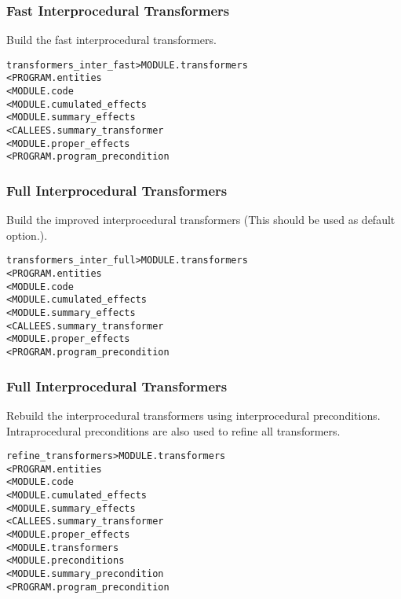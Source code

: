\documentclass[a4paper]{report}
\newenvironment{PipsMake}{\begin{alltt}}{\end{alltt}}
\begin{document}
\subsubsection{Fast Interprocedural Transformers}

Build the fast interprocedural transformers.

\begin{PipsMake}
transformers_inter_fast         > MODULE.transformers
        < PROGRAM.entities
        < MODULE.code
        < MODULE.cumulated_effects
        < MODULE.summary_effects
        < CALLEES.summary_transformer
        < MODULE.proper_effects
        < PROGRAM.program_precondition
\end{PipsMake}

\subsubsection{Full Interprocedural Transformers}

Build the improved interprocedural transformers (This should be used
as default option.).

\begin{PipsMake}
transformers_inter_full         > MODULE.transformers
        < PROGRAM.entities
        < MODULE.code
        < MODULE.cumulated_effects
        < MODULE.summary_effects
        < CALLEES.summary_transformer
        < MODULE.proper_effects
        < PROGRAM.program_precondition
\end{PipsMake}

\subsubsection{Full Interprocedural Transformers}

Rebuild the interprocedural transformers using interprocedural
preconditions. Intraprocedural preconditions are also used to refine all
transformers.

\begin{PipsMake}
refine_transformers         > MODULE.transformers
        < PROGRAM.entities
        < MODULE.code
        < MODULE.cumulated_effects
        < MODULE.summary_effects
        < CALLEES.summary_transformer
        < MODULE.proper_effects
        < MODULE.transformers
        < MODULE.preconditions
        < MODULE.summary_precondition
        < PROGRAM.program_precondition
\end{PipsMake}
\end{document}
